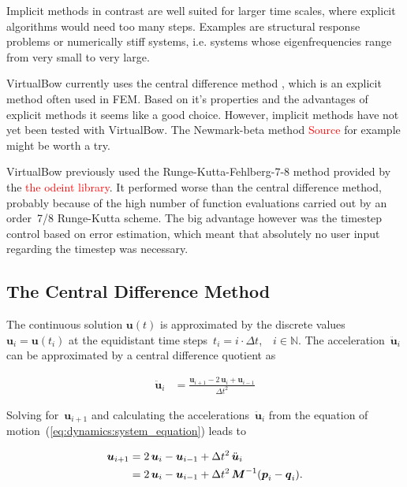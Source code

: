 Implicit methods in contrast are well suited for larger time scales, where explicit algorithms would need too many steps.
Examples are structural response problems or numerically stiff systems, i.e. systems whose eigenfrequencies range from very small to very large.

VirtualBow currently uses the central difference method \cite{bib:dynamic_solution}, which is an explicit method often used in FEM.
Based on it's properties and the advantages of explicit methods it seems like a good choice.
However, implicit methods have not yet been tested with VirtualBow. The Newmark-beta method \textcolor{red}{Source} for example might be worth a try.

VirtualBow previously used the Runge-Kutta-Fehlberg-7-8 method provided by the \textcolor{red}{the odeint library}.
It performed worse than the central difference method, probably because of the high number of function evaluations carried out by an order~7/8 Runge-Kutta scheme.
The big advantage however was the timestep control based on error estimation, which meant that absolutely no user input regarding the timestep was necessary.

\subsection{The Central Difference Method}

The continuous solution $\boldsymbol{u}(t)$ is approximated by the discrete values~$\boldsymbol{u}_i = \boldsymbol{u}(t_{i})$ at the equidistant time steps~$t_i = i\cdot\Delta t$,\ \ $i \in \mathbb{N}$.
The acceleration~$\ddot{\boldsymbol{u}}_i$ can be approximated by a central difference quotient as

\begin{align}
\ddot{\boldsymbol{u}}_i &= \frac{\boldsymbol{u}_{i+1} - 2\,\boldsymbol{u}_{i} + \boldsymbol{u}_{i-1}}{\Delta t^2}\label{eq:dynamics:difference_acceleration}
\end{align}

Solving for~$\boldsymbol{u}_{i+1}$ and calculating the accelerations~$\ddot{\boldsymbol{u}}_{i}$ from the equation of motion~(\ref{eq:dynamics:system_equation}) leads to

\begin{align}
\boldsymbol{u}_{i+1} &= 2\,\boldsymbol{u}_{i} - \boldsymbol{u}_{i-1} + \Delta t^2\,\ddot{\boldsymbol{u}}_{i}\notag\\
&= 2\,\boldsymbol{u}_{i} - \boldsymbol{u}_{i-1} + \Delta t^2\,\boldsymbol{M}^{-1}(\boldsymbol{p}_i - \boldsymbol{q}_i).
\end{align}


